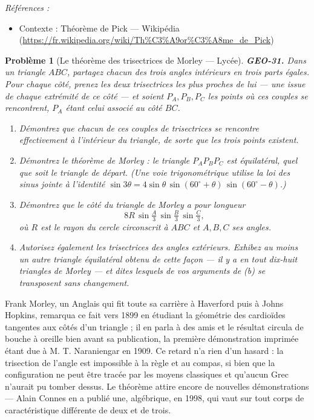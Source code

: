 \documentclass[11pt]{article}
\newtheorem{problem}{Problème}
\newenvironment{refs}{\par\small\noindent\emph{Références :}\begin{itemize}\setlength\itemsep{0pt}}{\end{itemize}\normalsize}
\begin{document}
\begin{refs}
\item Contexte : Théorème de Pick --- Wikipédia (\url{https://fr.wikipedia.org/wiki/Th%C3%A9or%C3%A8me_de_Pick})
\end{refs}

\bigskip

\begin{problem}[{Le théorème des trisectrices de Morley --- Lycée}]
\textbf{GEO-31.} Dans un triangle $ ABC $, partagez chacun des trois angles intérieurs en trois
parts égales. Pour chaque côté, prenez les deux trisectrices les plus proches de lui --- une issue de
chaque extrémité de ce côté --- et soient $ P_A, P_B, P_C $ les points où ces couples se rencontrent,
$ P_A $ étant celui associé au côté $ BC $.
\begin{enumerate}
\item[(a)] Démontrez que chacun de ces couples de trisectrices se rencontre effectivement à l'intérieur du
triangle, de sorte que les trois points existent.
\item[(b)] Démontrez le théorème de Morley : le triangle $ P_A P_B P_C $ est équilatéral, quel que soit le
triangle de départ. (Une voie trigonométrique utilise la loi des sinus jointe à l'identité
$ \sin 3\theta = 4 \sin\theta \, \sin(60^\circ + \theta) \, \sin(60^\circ - \theta) $.)
\item[(c)] Démontrez que le côté du triangle de Morley a pour longueur
\[ 8R \, \sin\tfrac{A}{3} \, \sin\tfrac{B}{3} \, \sin\tfrac{C}{3} , \]
où $ R $ est le rayon du cercle circonscrit à $ ABC $ et $ A, B, C $ ses angles.
\item[(d)] Autorisez également les trisectrices des angles \textit{extérieurs}. Exhibez au moins un autre
triangle équilatéral obtenu de cette façon --- il y a en tout dix-huit triangles de Morley --- et dites
lesquels de vos arguments de (b) se transposent sans changement.
\end{enumerate}

\end{problem}

\noindent Frank Morley, un Anglais qui fit toute sa carrière à Haverford puis à Johns Hopkins,
remarqua ce fait vers 1899 en étudiant la géométrie des cardioïdes tangentes aux côtés d'un triangle ;
il en parla à des amis et le résultat circula de bouche à oreille bien avant sa publication, la
première démonstration imprimée étant due à M. T. Naraniengar en 1909. Ce retard n'a rien d'un
hasard : la trisection de l'angle est impossible à la règle et au compas, si bien que la configuration
ne peut être tracée par les moyens classiques et qu'aucun Grec n'aurait pu tomber dessus. Le théorème
attire encore de nouvelles démonstrations --- Alain Connes en a publié une, algébrique, en 1998, qui
vaut sur tout corps de caractéristique différente de deux et de trois.
\end{document}
